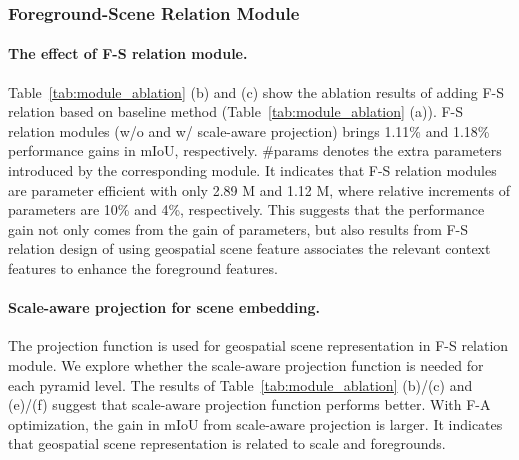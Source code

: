 \documentclass[10pt,twocolumn,letterpaper]{article}
\begin{document}
\subsubsection{Foreground-Scene Relation Module}


\paragraph{The effect of F-S relation module.}
Table~\ref{tab:module_ablation} (b) and (c) show the ablation results of adding F-S relation based on baseline method (Table~\ref{tab:module_ablation} (a)).
F-S relation modules (w/o and w/ scale-aware projection) brings 1.11\% and 1.18\% performance gains in mIoU, respectively.
\#params denotes the extra parameters introduced by the corresponding module.
It indicates that F-S relation modules are parameter efficient with only 2.89 M and 1.12 M, where relative increments of parameters are  10\% and  4\%, respectively.
This suggests that the performance gain not only comes from the gain of parameters, but also results from F-S relation design of using geospatial scene feature associates the relevant context features to enhance the foreground features.


\paragraph{Scale-aware projection for scene embedding.}
The projection function  is used for geospatial scene representation in F-S relation module.
We explore whether the scale-aware projection function  is needed for each pyramid level.
The results of Table~\ref{tab:module_ablation} (b)/(c) and (e)/(f) suggest that scale-aware projection function performs better.
With F-A optimization, the gain in mIoU from scale-aware projection is larger.
It indicates that geospatial scene representation is related to scale and foregrounds.
\end{document}
